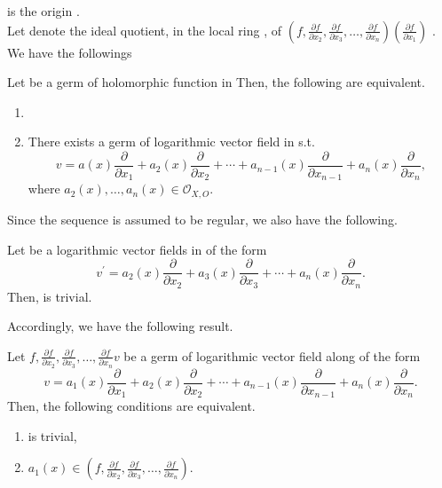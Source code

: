 \documentclass{arxsigma}
\begin{document}
is the origin  .\\ Let     denote the ideal quotient, in the local ring  ,
of
$(f, \frac{\partial f}{\partial x_2}, \frac{\partial f}{\partial x_3},\ldots,
\frac{\partial f}{\partial x_{n}})   (\frac{\partial f}{\partial x_1}) $
.\\ We have the followings
\begin{lemma}
Let   be a germ of holomorphic function in  Then, the following are equivalent.
\begin{enumerate}
\item  
\item There exists a germ of logarithmic vector field   in   s.t.
\begin{equation*}
v= a(x)\frac{\partial }{\partial x_1} + a_2(x)\frac{\partial}{\partial x_2} + \cdots + a_{n-1}(x)\frac{\partial}{\partial x_{n-1}}+ a_n(x)\frac{\partial}{\partial x_n},
\end{equation*}
where $
a_2(x), \ldots , a_{n}(x) \in{\mathcal O}_{X, O}. $
\end{enumerate}
\end{lemma}
Since the sequence
  is assumed to be
regular, we also have the following.
\begin{lemma}
Let   be a logarithmic vector fields in
  of the form
\begin{equation*}
v^{\prime}= a_2(x)\frac{\partial }{\partial x_2} + a_3(x)\frac{\partial}{\partial x_3} + \cdots +a_{n}(x)\frac{\partial}{\partial x_{n}}.
\end{equation*}
Then,   is trivial.
\end{lemma}
Accordingly, we have the following result.
\begin{proposition}
Let
$ f, \frac{\partial f}{\partial x_2}, \frac{\partial f}{\partial x_3},\ldots,
\frac{\partial f}{\partial x_{n}}   v $ be a germ of logarithmic
vector field along   of the form
\begin{equation*}
v= \displaystyle{a_1(x)\frac{\partial }{\partial x_1} + a_2(x)\frac{\partial}{\partial x_2} + \cdots +
a_{n-1}(x)\frac{\partial}{\partial x_{n-1}}+ a_n(x)\frac{\partial}{\partial x_n}}.
\end{equation*}
Then, the following conditions are equivalent.
\begin{enumerate}
\item  is trivial,
\item $ a_1(x) \in
(f, \frac{\partial f}{\partial x_2}, \frac{\partial f}{\partial x_3},\ldots,\frac{\partial f}{\partial x_{n}}).
$ \\ \end{enumerate}
\end{proposition}
\end{document}
